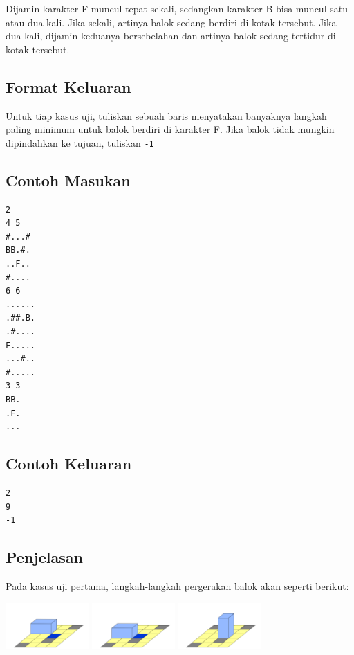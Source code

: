 \documentclass{article}
\begin{document}
Dijamin karakter F muncul tepat sekali, sedangkan karakter B bisa muncul satu atau dua kali. Jika sekali, artinya balok sedang berdiri di kotak tersebut. Jika dua kali, dijamin keduanya bersebelahan dan artinya balok sedang tertidur di kotak tersebut.

\subsection*{Format Keluaran}
Untuk tiap kasus uji, tuliskan sebuah baris menyatakan banyaknya langkah paling minimum untuk balok berdiri di karakter F. Jika balok tidak mungkin dipindahkan ke tujuan, tuliskan \lstinline{-1}
\\

\begin{multicols}{2}
\subsection*{Contoh Masukan}
\begin{lstlisting}
2
4 5
#...#
BB.#.
..F..
#....
6 6
......
.##.B.
.#....
F.....
...#..
#.....
3 3
BB.
.F.
...
\end{lstlisting}
\columnbreak
\subsection*{Contoh Keluaran}
\begin{lstlisting}
2
9
-1
\end{lstlisting}
\vfill
\null
\end{multicols}


\subsection*{Penjelasan}
Pada kasus uji pertama, langkah-langkah pergerakan balok akan seperti berikut:

\includegraphics[width=120px]{sample-1-1}
\includegraphics[width=120px]{sample-1-2}
\includegraphics[width=120px]{sample-1-3}

\pagebreak
\end{document}
